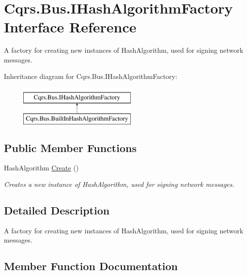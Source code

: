 \hypertarget{interfaceCqrs_1_1Bus_1_1IHashAlgorithmFactory}{}\section{Cqrs.\+Bus.\+I\+Hash\+Algorithm\+Factory Interface Reference}
\label{interfaceCqrs_1_1Bus_1_1IHashAlgorithmFactory}


A factory for creating new instances of Hash\+Algorithm, used for signing network messages.  


Inheritance diagram for Cqrs.\+Bus.\+I\+Hash\+Algorithm\+Factory\+:\begin{figure}[H]
\begin{center}
\leavevmode
\includegraphics[height=2.000000cm]{interfaceCqrs_1_1Bus_1_1IHashAlgorithmFactory}
\end{center}
\end{figure}
\subsection*{Public Member Functions}
\begin{DoxyCompactItemize}
\item 
Hash\+Algorithm \hyperlink{interfaceCqrs_1_1Bus_1_1IHashAlgorithmFactory_ac455d44ba9db8007c06df94df54885ee_ac455d44ba9db8007c06df94df54885ee}{Create} ()
\begin{DoxyCompactList}\small\item\em Creates a new instance of Hash\+Algorithm, used for signing network messages. \end{DoxyCompactList}\end{DoxyCompactItemize}


\subsection{Detailed Description}
A factory for creating new instances of Hash\+Algorithm, used for signing network messages. 



\subsection{Member Function Documentation}
\mbox{\label{interfaceCqrs_1_1Bus_1_1IHashAlgorithmFactory_ac455d44ba9db8007c06df94df54885ee_ac455d44ba9db8007c06df94df54885ee}} 
